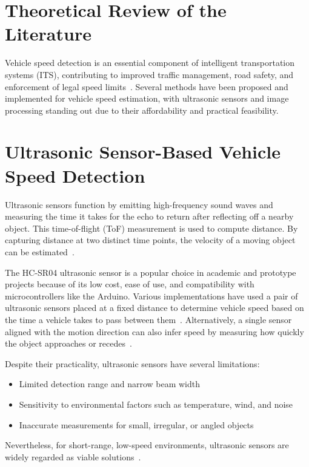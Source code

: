 
\section{Theoretical Review of the Literature}

Vehicle speed detection is an essential component of intelligent transportation systems (ITS), contributing to improved traffic management, road safety, and enforcement of legal speed limits~\cite{its_overview}. Several methods have been proposed and implemented for vehicle speed estimation, with ultrasonic sensors and image processing standing out due to their affordability and practical feasibility.

\section*{Ultrasonic Sensor-Based Vehicle Speed Detection}

Ultrasonic sensors function by emitting high-frequency sound waves and measuring the time it takes for the echo to return after reflecting off a nearby object. This time-of-flight (ToF) measurement is used to compute distance. By capturing distance at two distinct time points, the velocity of a moving object can be estimated~\cite{ultrasonic_random_nerd}.

The HC-SR04 ultrasonic sensor is a popular choice in academic and prototype projects because of its low cost, ease of use, and compatibility with microcontrollers like the Arduino. Various implementations have used a pair of ultrasonic sensors placed at a fixed distance to determine vehicle speed based on the time a vehicle takes to pass between them~\cite{ultrasonic_researchgate}. Alternatively, a single sensor aligned with the motion direction can also infer speed by measuring how quickly the object approaches or recedes~\cite{ultrasonic_ieee_paper}.

Despite their practicality, ultrasonic sensors have several limitations:
\begin{itemize}
    \item Limited detection range and narrow beam width
    \item Sensitivity to environmental factors such as temperature, wind, and noise
    \item Inaccurate measurements for small, irregular, or angled objects
\end{itemize}

Nevertheless, for short-range, low-speed environments, ultrasonic sensors are widely regarded as viable solutions~\cite{ultrasonic_instructables}.

